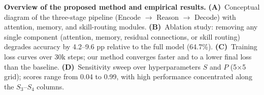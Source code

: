 \caption{\textbf{Overview of the proposed method and empirical results.}
\textbf{(A)}~Conceptual diagram of the three-stage pipeline (Encode $\to$ Reason $\to$ Decode) with attention, memory, and skill-routing modules.
\textbf{(B)}~Ablation study: removing any single component (attention, memory, residual connections, or skill routing) degrades accuracy by 4.2--9.6 pp relative to the full model (64.7\%).
\textbf{(C)}~Training loss curves over 30k steps; our method converges faster and to a lower final loss than the baseline.
\textbf{(D)}~Sensitivity sweep over hyperparameters $S$ and $P$ (5$\times$5 grid); scores range from 0.04 to 0.99, with high performance concentrated along the $S_3$--$S_4$ columns.}
